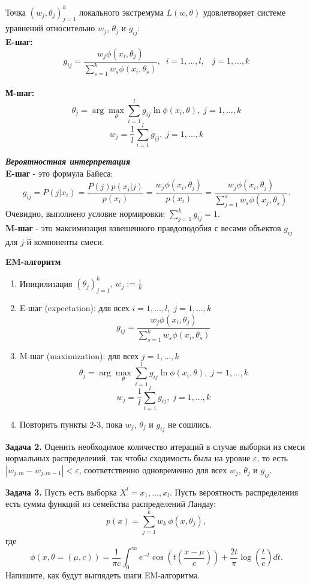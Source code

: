 \begin{theorem}

    Точка $(w_j, \theta_j)_{j=1}^k$ локального экстремума $L(w,\theta)$ удовлетворяет системе уравнений относительно $w_j$, $\theta_j$ и $g_{ij}$:
    \\
    \textbf{E-шаг: }
    $$g_{ij} = \frac{w_j \phi(x_i,\theta_j)}{\sum_{s=1}^k w_s \phi(x_i, \theta_s)}, \; \; i=1,...,l, \;\;\; j = 1,...,k$$
    \\
    \textbf{М-шаг: }
    $$\theta_j = \arg \max_\theta \sum_{i=1}^l g_{ij} \ln \phi(x_i, \theta), \; j=1,...,k $$
    $$w_j = \frac{1}{l} \sum_{i=1}^l g_{ij}, \; j=1,...,k$$

\end{theorem}

\textbf{\textit{Вероятностная интерпретация}}
\\
\textbf{E-шаг} - это формула Байеса:
$$g_{ij} = P(j|x_i) = \frac{P(j)p(x_i|j)}{p(x_i)} = \frac{w_j \phi(x_i, \theta_j)}{p(x_i)} = \frac{w_j \phi(x_i,\theta_j)}{\sum_{j=1}^s w_s \phi(x_j, \theta_s)}.$$
Очевидно, выполнено условие нормировки: $\sum_{j=1}^k g_{ij} = 1.$
\\
\textbf{M-шаг} - это максимизация взвешенного правдоподобия с весами объектов $g_{ij}$ для $j$-й компоненты смеси.


\textbf{EM-aлгоритм}
\begin{enumerate}
    \item Иницилизация $(\theta_j)_{j=1}^k, \, w_j:=\frac{1}{k}$
    \item E-шаг (expectation): для всех $i=1,...,l, \; j = 1,...,k$
          $$g_{ij} = \frac{w_j \phi(x_i,\theta_j)}{\sum_{s=1}^k w_s \phi(x_i, \theta_s)}$$
    \item M-шаг (maximization): для всех $j=1,...,k$
          $$\theta_j = \arg \max_\theta \sum_{i=1}^l g_{ij} \ln \phi(x_i, \theta), \; j=1,...,k $$
          $$w_j = \frac{1}{l} \sum_{i=1}^l g_{ij}, \; j=1,...,k$$
    \item Повторить пункты 2-3, пока $w_j$, $\theta_j$ и $g_{ij}$ не сошлись.

\end{enumerate}

\textbf{Задача 2.} Оценить необходимое количество итераций в случае выборки из смеси нормальных распределений, так чтобы сходимость была на уровне $\varepsilon$, то есть $|w_{j,m} - w_{j,m-1}|<\varepsilon$, соответственно одновременно для всех $w_j$, $\theta_j$ и $g_{ij}$.

\textbf{Задача 3.} Пусть есть выборка $X^l = {x_1,...,x_l}$. Пусть вероятность распределения есть сумма функций из семейства распределений Ландау:
$$p(x) = \sum_{j=1}^k w_k \, \phi(x,\theta_j),$$
где $$\phi(x,\theta = (\mu,c)) = \frac{1}{\pi c} \int_0^\infty e^{-t} \cos \left(t \left(\frac{x-\mu}{c}\right)\right) +\frac{2t}{\pi} \log\left(\frac{t}{c}\right) dt.$$
Напишите, как будут выглядеть шаги EM-алгоритма.

